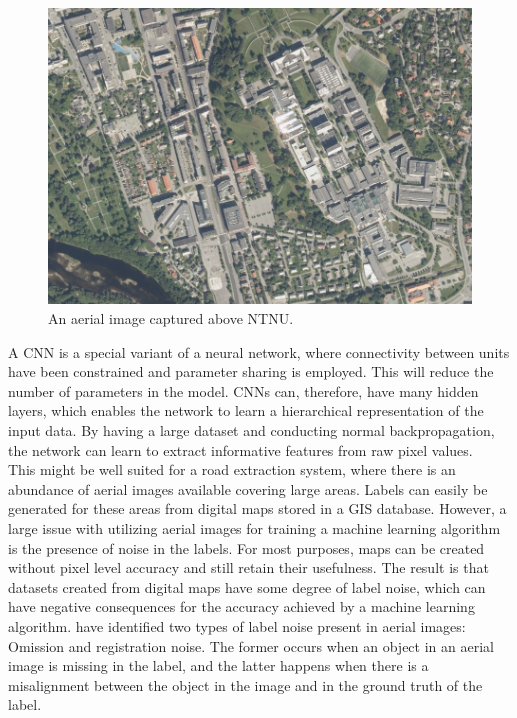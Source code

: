 \begin{figure}[t]
\begin{center}
\includegraphics[width=0.8\columnwidth]{figs/aerial_image.png}
\caption[Aerial image]{An aerial image captured above NTNU.}
\label{fig:aerialimage}
\end{center}
\end{figure}

A \ac{CNN} is a special variant of a neural network, where connectivity between units have been constrained and parameter sharing is employed. This will reduce the number of parameters in the model. \ac{CNN}s can, therefore, have many hidden layers, which enables the network to learn a hierarchical representation of the input data. By having a large dataset and conducting normal backpropagation, the network can learn to extract informative features from raw pixel values. \\

This might be well suited for a road extraction system, where there is an abundance of aerial images available covering large areas. Labels can easily be generated for these areas from digital maps stored in a \ac{GIS} database. However, a large issue with utilizing aerial images for training a machine learning algorithm is the presence of noise in the labels. For most purposes, maps can be created without pixel level accuracy and still retain their usefulness. The result is that datasets created from digital maps have some degree of label noise, which can have negative consequences for the accuracy achieved by a machine learning algorithm. \cite{Mnih_aerial_images_noisy} have identified two types of label noise present in aerial images: Omission and registration noise. The former occurs when an object in an aerial image is missing in the label, and the latter happens when there is a misalignment between the object in the image and in the ground truth of the label.\\


